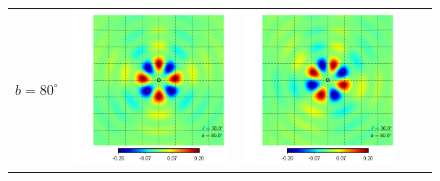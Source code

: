 \documentclass[a4paper,11pt]{article}
\begin{document}
\begin{figure}[!t]
\begin{center}
\begin{tabular}{m{8ex}m{}m{}|m{}m{}}
$b=80^\circ$&
\hspace{\kernelfigspace}\includegraphics[width=\kernelfigwidth]{qu2ebqu_rker_D_lat80_lon30.pdf} &
\hspace{\kernelfigspace}\includegraphics[width=\kernelfigwidth]{qu2ebqu_iker_D_lat80_lon30.pdf} &

\end{tabular}
\end{center}
\end{figure}
\end{document}
